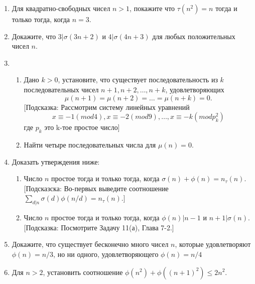 \documentclass[11pt]{article}
\begin{document}
\begin{enumerate}
  \item  Для квадратно-свободных чисел $n > 1$, покажите что $\tau(n^2) = n$ тогда и только тогда, когда $n = 3$.
  \item Докажите, что $3 | \sigma(3n+2)$ и $4 | \sigma(4n + 3)$ для любых положительных чисел $n$. 
  \item
    \begin{enumerate}
        \item Дано $k > 0$, установите, что существует последовательность из $k$ последовательных чисел $n+1, n+2, \dots , n+k$, удовлетворяющих
        $$\mu (n+1) = \mu (n+2) = \dots = \mu (n+k) = 0.$$
        [Подсказка: Рассмотрим систему линейных уравнений
        $$ x \equiv -1 (mod 4), x \equiv -2 (mod 9), \dots , x \equiv -k (mod p_k^2) $$
        где $p_k$ это k-тое простое число]
        \item Найти четыре последовательных числа для $\mu(n) = 0.$
    \end{enumerate}
  \item Доказать утверждения ниже:
    \begin{enumerate}
        \item Число $n$ простое тогда и только тогда, когда $\sigma(n) + \phi(n) = n_{\tau}(n)$. [Подсказска: Во-первых выведите соотношение $\sum_{d|n} \sigma(d)\phi(n/d) = n_{\tau}(n).$]
        \item Число $n$ простое тогда и только тогда, когда $\phi(n) | n - 1$ и $ n + 1 | \sigma(n)$. [Подсказка: Посмотрите Задачу 11(а), Глава 7-2.]
    \end{enumerate}
  \item Докажите, что существует бесконечно много чисел $n$, которые удовлетворяют $\phi(n) = n/3$, но ни одного, удовлетворяющего $\phi(n) = n/4$
  \item Для $n > 2$, установить соотношение $\phi(n^2) + \phi((n+1)^2) \leq 2n^2$.
\end{enumerate}
\end{document}

